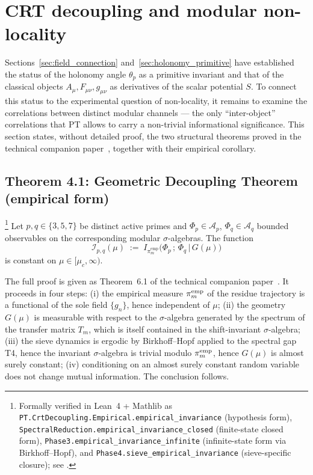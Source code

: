 \section{CRT decoupling and modular non-locality}
\label{sec:crt_decoupling}

Sections~\ref{sec:field_connection} and~\ref{sec:holonomy_primitive}
have established the status of the holonomy angle $\theta_p$ as a
primitive invariant and that of the classical objects $A_\mu,
F_{\mu\nu}, g_{\mu\nu}$ as derivatives of the scalar potential
$S$. To connect this status to the experimental question of
non-locality, it remains to examine the correlations between
distinct modular channels --- the only ``inter-object''
correlations that PT allows to carry a non-trivial informational
significance. This section states, without detailed proof, the
two structural theorems proved in the technical companion
paper~\cite{PT_CRT_DECOUPLING}, together with their empirical
corollary.

\subsection{Theorem 4.1: Geometric Decoupling Theorem (empirical form)}
\label{ssec:thm_4_1_en}

\begin{theorem}
\label{thm:invariance_geom_en}
\footnote{Formally verified in Lean~4 + Mathlib as
\texttt{PT.CrtDecoupling.Empirical.empirical\_invariance}
(hypothesis form),
\texttt{SpectralReduction.empirical\_invariance\_closed}
(finite-state closed form),
\texttt{Phase3.empirical\_invariance\_infinite}
(infinite-state form via Birkhoff--Hopf), and
\texttt{Phase4.sieve\_empirical\_invariance}
(sieve-specific closure);
see \cite[\S~8.5]{PT_CRT_DECOUPLING}.}
Let $p, q \in \{3, 5, 7\}$ be distinct active primes and
$\Phi_p \in \mathcal{A}_p$, $\Phi_q \in \mathcal{A}_q$ bounded
observables on the corresponding modular $\sigma$-algebras. The
function
\begin{equation}
  \mathcal{I}_{p,q}(\mu)
  \;:=\;
  I_{\pi_m^{\mathrm{emp}}}\!\bigl(\Phi_p\,;\,\Phi_q\,\big|\,G(\mu)\bigr)
\end{equation}
is constant on $\mu \in [\mu_c, \infty)$.
\end{theorem}

The full proof is given as Theorem~6.1 of the technical
companion paper~\cite{PT_CRT_DECOUPLING}. It proceeds in four
steps: (i) the empirical measure $\pi_m^{\rm emp}$ of the residue
trajectory is a functional of the sole field $\{g_n\}$, hence
independent of $\mu$; (ii) the geometry $G(\mu)$ is measurable
with respect to the $\sigma$-algebra generated by the spectrum of
the transfer matrix $T_m$, which is itself contained in the
shift-invariant $\sigma$-algebra; (iii) the sieve dynamics is
ergodic by Birkhoff--Hopf applied to the spectral gap T4, hence
the invariant $\sigma$-algebra is trivial modulo
$\pi_m^{\rm emp}$, hence $G(\mu)$ is almost surely constant;
(iv) conditioning on an almost surely constant random variable
does not change mutual information. The conclusion follows.

